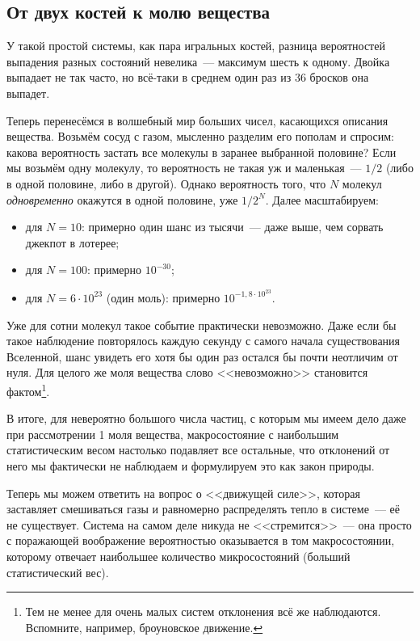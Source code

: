 \subsection*{От двух костей к молю вещества}

У такой простой системы, как пара игральных костей, разница вероятностей выпадения разных состояний невелика~--- максимум шесть к одному. Двойка выпадает не так часто, но всё-таки в среднем один раз из 36 бросков она выпадет.

Теперь перенесёмся в волшебный мир больших чисел, касающихся описания вещества. Возьмём сосуд с газом, мысленно разделим его пополам и спросим: какова вероятность застать все молекулы в заранее выбранной половине? Если мы возьмём одну молекулу, то вероятность не такая уж и маленькая~--- $1/2$ (либо в одной половине, либо в другой). Однако вероятность того, что $N$ молекул \emph{одновременно} окажутся в одной половине, уже $1/2^N$. Далее масштабируем:

\begin{itemize}
    \item для $N = 10$: примерно один шанс из тысячи~--- даже выше, чем сорвать джекпот в лотерее;
    \item для $N = 100$: примерно $10^{-30}$;
    \item для $N = 6\cdot10^{23}$ (один моль): примерно $10^{-1{,}8\cdot 10^{23}}$.
\end{itemize}

Уже для сотни молекул такое событие практически невозможно. Даже если бы такое наблюдение повторялось каждую секунду с самого начала существования Вселенной, шанс увидеть его хотя бы один раз остался бы почти неотличим от нуля. Для целого же моля вещества слово <<невозможно>> становится фактом\footnote{Тем не менее для очень малых систем отклонения всё же наблюдаются. Вспомните, например, броуновское движение.}.

В итоге, для невероятно большого числа частиц, с которым мы имеем дело даже при рассмотрении 1 моля вещества, макросостояние с наибольшим статистическим весом настолько подавляет все остальные, что отклонений от него мы фактически не наблюдаем и формулируем это как закон природы.

Теперь мы можем ответить на вопрос о <<движущей силе>>, которая заставляет смешиваться газы и равномерно распределять тепло в системе~--- её не существует. Система на самом деле никуда не <<стремится>>~--- она просто с поражающей воображение вероятностью оказывается в том макросостоянии, которому отвечает наибольшее количество микросостояний (больший статистический вес).

